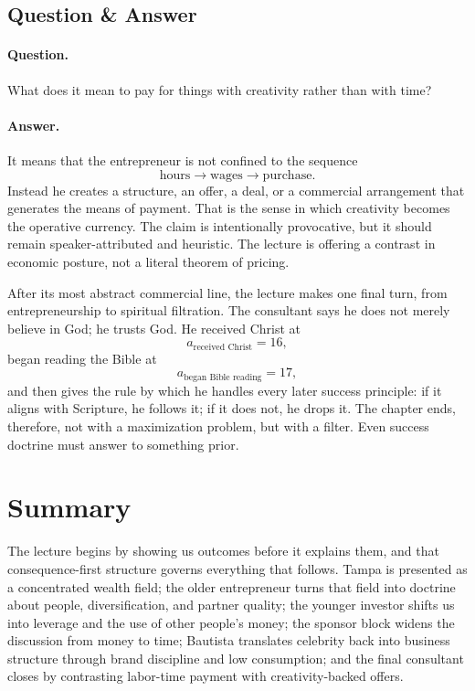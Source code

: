 \subsection{Question \& Answer}

\paragraph{Question.} What does it mean to pay for things with creativity rather than with time?

\paragraph{Answer.} It means that the entrepreneur is not confined to the sequence
\[
\text{hours} \to \text{wages} \to \text{purchase}.
\]
Instead he creates a structure, an offer, a deal, or a commercial arrangement that generates the means of payment. That is the sense in which creativity becomes the operative currency. The claim is intentionally provocative, but it should remain speaker-attributed and heuristic. The lecture is offering a contrast in economic posture, not a literal theorem of pricing.

After its most abstract commercial line, the lecture makes one final turn, from entrepreneurship to spiritual filtration. The consultant says he does not merely believe in God; he trusts God. He received Christ at
\begin{equation}
a_{\text{received Christ}} = 16,
\end{equation}
began reading the Bible at
\begin{equation}
a_{\text{began Bible reading}} = 17,
\end{equation}
and then gives the rule by which he handles every later success principle: if it aligns with Scripture, he follows it; if it does not, he drops it. The chapter ends, therefore, not with a maximization problem, but with a filter. Even success doctrine must answer to something prior.

\section{Summary}

The lecture begins by showing us outcomes before it explains them, and that consequence-first structure governs everything that follows. Tampa is presented as a concentrated wealth field; the older entrepreneur turns that field into doctrine about people, diversification, and partner quality; the younger investor shifts us into leverage and the use of other people's money; the sponsor block widens the discussion from money to time; Bautista translates celebrity back into business structure through brand discipline and low consumption; and the final consultant closes by contrasting labor-time payment with creativity-backed offers.


